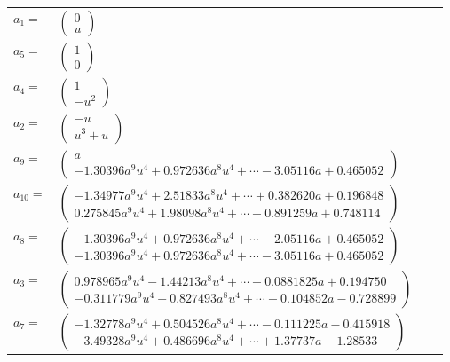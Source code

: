 \documentclass[1p]{elsarticle_modified}
\theoremstyle{definition}
\begin{document}
\begin{tabular}{m{7pt} m{180pt} m{7pt} m{180pt} }
\flushright $a_{1}=$&$\begin{pmatrix}0\\u\end{pmatrix}$ \\
\flushright $a_{5}=$&$\begin{pmatrix}1\\0\end{pmatrix}$ \\
\flushright $a_{4}=$&$\begin{pmatrix}1\\- u^2\end{pmatrix}$ \\
\flushright $a_{2}=$&$\begin{pmatrix}- u\\u^3+u\end{pmatrix}$ \\
\flushright $a_{9}=$&$\begin{pmatrix}a\\-1.30396 a^{9} u^{4}+0.972636 a^{8} u^{4}+\cdots-3.05116 a+0.465052\end{pmatrix}$ \\
\flushright $a_{10}=$&$\begin{pmatrix}-1.34977 a^{9} u^{4}+2.51833 a^{8} u^{4}+\cdots+0.382620 a+0.196848\\0.275845 a^{9} u^{4}+1.98098 a^{8} u^{4}+\cdots-0.891259 a+0.748114\end{pmatrix}$ \\
\flushright $a_{8}=$&$\begin{pmatrix}-1.30396 a^{9} u^{4}+0.972636 a^{8} u^{4}+\cdots-2.05116 a+0.465052\\-1.30396 a^{9} u^{4}+0.972636 a^{8} u^{4}+\cdots-3.05116 a+0.465052\end{pmatrix}$ \\
\flushright $a_{3}=$&$\begin{pmatrix}0.978965 a^{9} u^{4}-1.44213 a^{8} u^{4}+\cdots-0.0881825 a+0.194750\\-0.311779 a^{9} u^{4}-0.827493 a^{8} u^{4}+\cdots-0.104852 a-0.728899\end{pmatrix}$ \\
\flushright $a_{7}=$&$\begin{pmatrix}-1.32778 a^{9} u^{4}+0.504526 a^{8} u^{4}+\cdots-0.111225 a-0.415918\\-3.49328 a^{9} u^{4}+0.486696 a^{8} u^{4}+\cdots+1.37737 a-1.28533\end{pmatrix}$ \\

\end{tabular}
\end{document}
